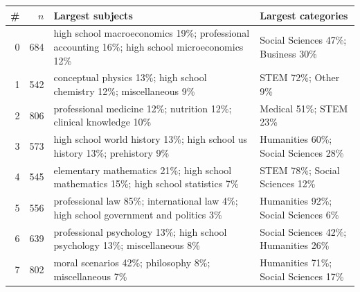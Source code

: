 \begin{tabular}{rr>{\raggedright\arraybackslash}p{7.2cm}>{\raggedright\arraybackslash}p{4.2cm}}
\toprule
\# & $n$ & Largest subjects & Largest categories \\
\midrule
0 & 684 & \footnotesize high school macroeconomics 19\%; professional accounting 16\%; high school microeconomics 12\% & \footnotesize Social Sciences 47\%; Business 30\% \\
1 & 542 & \footnotesize conceptual physics 13\%; high school chemistry 12\%; miscellaneous 9\% & \footnotesize STEM 72\%; Other 9\% \\
2 & 806 & \footnotesize professional medicine 12\%; nutrition 12\%; clinical knowledge 10\% & \footnotesize Medical 51\%; STEM 23\% \\
3 & 573 & \footnotesize high school world history 13\%; high school us history 13\%; prehistory 9\% & \footnotesize Humanities 60\%; Social Sciences 28\% \\
4 & 545 & \footnotesize elementary mathematics 21\%; high school mathematics 15\%; high school statistics 7\% & \footnotesize STEM 78\%; Social Sciences 12\% \\
5 & 556 & \footnotesize professional law 85\%; international law 4\%; high school government and politics 3\% & \footnotesize Humanities 92\%; Social Sciences 6\% \\
6 & 639 & \footnotesize professional psychology 13\%; high school psychology 13\%; miscellaneous 8\% & \footnotesize Social Sciences 42\%; Humanities 26\% \\
7 & 802 & \footnotesize moral scenarios 42\%; philosophy 8\%; miscellaneous 7\% & \footnotesize Humanities 71\%; Social Sciences 17\% \\
\bottomrule
\end{tabular}
